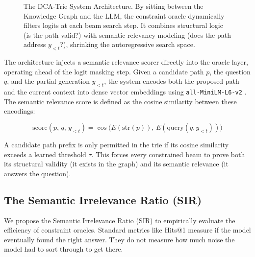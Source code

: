 \documentclass[11pt, letterpaper]{article}
\begin{document}
\begin{figure}[htbp]
{
    }
    \vspace{0.2cm}
    \caption{The DCA-Trie System Architecture. By sitting between the Knowledge Graph and the LLM, the constraint oracle dynamically filters logits at each beam search step. It combines structural logic (is the path valid?) with semantic relevancy modeling (does the path address $y_{<t}$?), shrinking the autoregressive search space.}
    \label{fig:architecture}
\end{figure}

The architecture injects a semantic relevance scorer directly into the oracle layer, operating ahead of the logit masking step. Given a candidate path $p$, the question $q$, and the partial generation $y_{<t}$, the system encodes both the proposed path and the current context into dense vector embeddings using \texttt{all-MiniLM-L6-v2} \citep{reimers2019sbert}. The semantic relevance score is defined as the cosine similarity between these encodings:

\begin{equation}
    \text{score}(p,\, q,\, y_{<t}) = \cos\!\bigl( E(\text{str}(p)),\, E(\text{query}(q, y_{<t})) \bigr)
\end{equation}

A candidate path prefix is only permitted in the trie if its cosine similarity exceeds a learned threshold $\tau$. This forces every constrained beam to prove both its structural validity (it exists in the graph) and its semantic relevance (it answers the question).

\subsection{The Semantic Irrelevance Ratio (SIR)}

We propose the Semantic Irrelevance Ratio (SIR) to empirically evaluate the efficiency of constraint oracles. Standard metrics like Hits@1 measure if the model eventually found the right answer. They do not measure how much noise the model had to sort through to get there.
\end{document}
